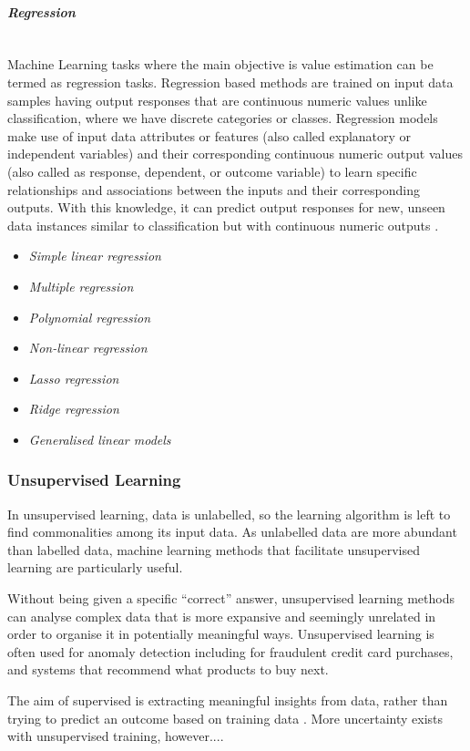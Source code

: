 \documentclass[12pt,a4paper]{article}
\newcommand{\myparagraph}[1]{\paragraph{#1}\mbox{}\\}
\begin{document}
\myparagraph{\textit{Regression}}
Machine Learning tasks where the main objective is value estimation can be termed as regression tasks.
Regression based methods are trained on input data samples having output responses that are continuous
numeric values unlike classification, where we have discrete categories or classes. Regression models
make use of input data attributes or features (also called explanatory or independent variables) and their
corresponding continuous numeric output values (also called as response, dependent, or outcome variable)
to learn specific relationships and associations between the inputs and their corresponding outputs. With
this knowledge, it can predict output responses for new, unseen data instances similar to classification but
with continuous numeric outputs \cite{Kononenko2007}.

\begin{itemize}
    \item \textit{Simple linear regression}
    \item \textit{Multiple regression}
    \item \textit{Polynomial regression}
    \item \textit{Non-linear regression}
    \item \textit{Lasso regression}
    \item \textit{Ridge regression}
    \item \textit{Generalised linear models}
\end{itemize}

\subsubsection{Unsupervised Learning}
In unsupervised learning, data is unlabelled, so the learning algorithm is left to find commonalities among its input data. As unlabelled data are more abundant than labelled data, machine learning methods that facilitate unsupervised learning are particularly useful.

Without being given a specific “correct” answer, unsupervised learning methods can analyse complex data that is more expansive and seemingly unrelated in order to organise it in potentially meaningful ways. Unsupervised learning is often used for anomaly detection including for fraudulent credit card purchases, and systems that recommend what products to buy next.

The aim of supervised is extracting meaningful insights from data, rather than trying to predict an outcome based on training data \cite{Kononenko2007}. More uncertainty exists with unsupervised training, however....
\end{document}
